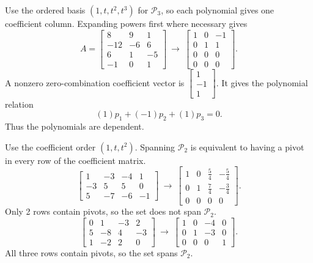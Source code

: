 Use the ordered basis $(1,t,t^2,t^3)$ for $\mathcal P_3$, so each polynomial gives one coefficient column. Expanding powers first where necessary gives
\[A=\left[\begin{array}{rrr}8&9&1\\-12&-6&6\\6&1&-5\\-1&0&1\end{array}\right]\ \longrightarrow\ \left[\begin{array}{rrr}1&0&-1\\0&1&1\\0&0&0\\0&0&0\end{array}\right].\]
A nonzero zero-combination coefficient vector is $\left[\begin{array}{r}1\\-1\\1\end{array}\right]$. It gives the polynomial relation
\[(1)p_{1}+(-1)p_{2}+(1)p_{3}=0.\]
Thus the polynomials are dependent.

Use the coefficient order $(1,t,t^2)$. Spanning $\mathcal P_2$ is equivalent to having a pivot in every row of the coefficient matrix.
\[\left[\begin{array}{rrrr}1&-3&-4&1\\-3&5&5&0\\5&-7&-6&-1\end{array}\right]\ \longrightarrow\ \left[\begin{array}{rrrr}1&0&\frac{5}{4}&- \frac{5}{4}\\0&1&\frac{7}{4}&- \frac{3}{4}\\0&0&0&0\end{array}\right].\]
Only 2 rows contain pivots, so the set does not span $\mathcal P_2$.
\[\left[\begin{array}{rrrr}0&1&-3&2\\5&-8&4&-3\\1&-2&2&0\end{array}\right]\ \longrightarrow\ \left[\begin{array}{rrrr}1&0&-4&0\\0&1&-3&0\\0&0&0&1\end{array}\right].\]
All three rows contain pivots, so the set spans $\mathcal P_2$.


